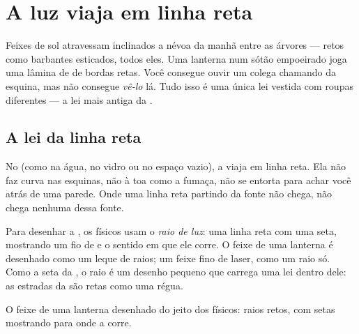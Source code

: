 \chapter{A luz viaja em linha reta}\label{ch:g4:light-straight-lines}

Feixes de sol atravessam inclinados a névoa da manhã entre as árvores
--- retos como barbantes esticados, todos eles. Uma lanterna num
sótão empoeirado joga uma lâmina de  de bordas retas. Você
consegue ouvir um colega chamando da esquina, mas não consegue
\emph{vê-lo} lá. Tudo isso é uma única lei vestida com roupas
diferentes --- a lei mais antiga da .

\section{A lei da linha reta}

\begin{proposition}\label{prop:g4:light-straight-lines:law}
No  (como na água, no vidro ou no espaço vazio), a  viaja em
linha reta. Ela não faz curva nas esquinas, não  à toa como a
fumaça, não se entorta para achar você atrás de uma parede. Onde uma
linha reta partindo da fonte não chega, não chega  nenhuma dessa
fonte.
\end{proposition}

\begin{definition}\label{def:g4:light-straight-lines:ray}
Para desenhar a , os físicos usam o \emph{raio de luz}: uma linha reta com uma seta, mostrando um fio de  e o
sentido em que ele corre. O feixe de uma lanterna é desenhado como um
leque de raios; um feixe fino de laser, como um raio só. Como a seta
da , o raio é um desenho pequeno que carrega uma lei dentro
dele: as estradas da  são retas como uma régua.
\end{definition}

\begin{omfigure}

{\small O feixe de uma lanterna desenhado do jeito dos físicos: raios
retos, com setas mostrando para onde a  corre.}
\end{omfigure}

